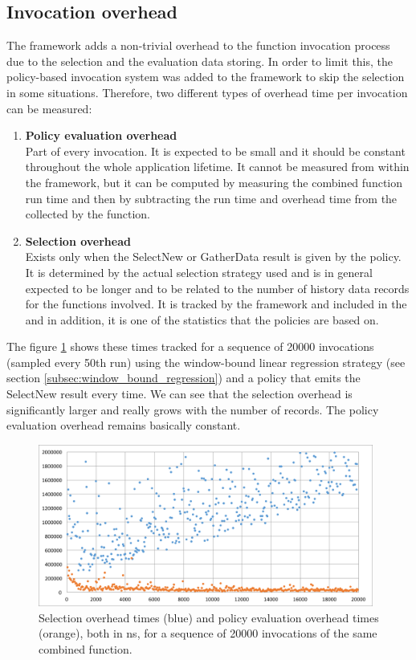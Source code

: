 \subsection{Invocation overhead}

The framework adds a non-trivial overhead to the function invocation process due to the selection and the evaluation data storing. In order to limit this, the policy-based invocation system was added to the framework to skip the selection in some situations. Therefore, two different types of overhead time per invocation can be measured:

\begin{enumerate}
	\item \textbf{Policy evaluation overhead}\\
	Part of every invocation. It is expected to be small and it should be constant throughout the whole application lifetime. It cannot be measured from within the framework, but it can be computed by measuring the combined function run time and then by subtracting the run time and overhead time from the  collected by the function.
	\item \textbf{Selection overhead}\\
	Exists only when the SelectNew or GatherData result is given by the policy. It is determined by the actual selection strategy used and is in general expected to be longer and to be related to the number of history data records for the functions involved. It is tracked by the framework and included in the  and in addition, it is one of the statistics that the policies are based on.
\end{enumerate}

The figure \ref{fig:overhead_sel_policy} shows these times tracked for a sequence of 20000 invocations (sampled every 50th run) using the window-bound linear regression strategy (see section \ref{subsec:window_bound_regression}) and a policy that emits the SelectNew result every time. We can see that the selection overhead is significantly larger and really grows with the number of records. The policy evaluation overhead remains basically constant.

\begin{figure}[h!]
	\captionsetup{justification=centering,margin=0.5cm}
	\centerline{\mbox{\includegraphics[width=110mm]{./img/overhead_sel_policy.png}}}
	\caption{Selection overhead times (blue) and policy evaluation overhead times (orange), both in ns, for a sequence of 20000 invocations of the same combined function.}
	\label{fig:overhead_sel_policy}
\end{figure}

